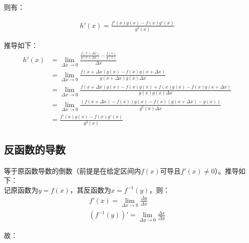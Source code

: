 则有：

\begin{equation*}
\begin{aligned}
h'(x) = \frac{f'(x)g(x) - f(x)g'(x)}{g^2(x)}
\end{aligned}
\end{equation*}

推导如下：\\

\begin{equation*}
\begin{aligned}
h'(x) & = \lim_{\Delta x \to 0}\frac{\frac{f(x + \Delta x)}{g(x + \Delta x)} - \frac{f(x)}{g(x)}}{\Delta x}\\
& = \lim_{\Delta x \to 0}\frac{f(x + \Delta x)g(x) - f(x)g(x + \Delta x)}{g(x + \Delta x)g(x)\Delta x}\\
& = \lim_{\Delta x \to 0}\frac{f(x + \Delta x)g(x) - f(x)g(x) + f(x)g(x) - f(x)g(x + \Delta x)}{g(x)g(x)\Delta x}\\
& = \lim_{\Delta x \to 0}\frac{(f(x + \Delta x)- f(x))g(x) - f(x)(g(x + \Delta x) - g(x))}{g^2(x)\Delta x}\\
& = \frac{f'(x)g(x) - f(x)g'(x)}{g^2(x)}
\end{aligned}
\end{equation*}

\subsection{反函数的导数}

\paragraph{\quad}

等于原函数导数的倒数（前提是在给定区间内$f(x)$可导且$f'(x) \neq 0$）。推导如下：\\

记原函数为$y = f(x)$，其反函数为$x = f^{-1}(y)$，则：\\

\begin{equation*}
\begin{aligned}
f'(x) = \lim_{\Delta x \to 0}\frac{\Delta y}{\Delta x}\\
(f^{-1}(y))' = \lim_{\Delta y \to 0}\frac{\Delta x}{\Delta y}
\end{aligned}
\end{equation*}

故：\\

